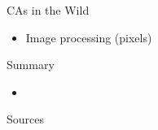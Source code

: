 \documentclass[bigger]{beamer}
\begin{document}
\begin{frame}[label=sec-22]{CAs in the Wild}
\begin{itemize}
\item<1->Image processing (pixels)
\end{itemize}
\end{frame}
\begin{frame}[label=sec-23]{Summary}
\begin{itemize}
\item<1->
\end{itemize}
\end{frame}

\begin{frame}[label=sec-24]{Sources}
\end{frame}
\end{document}
